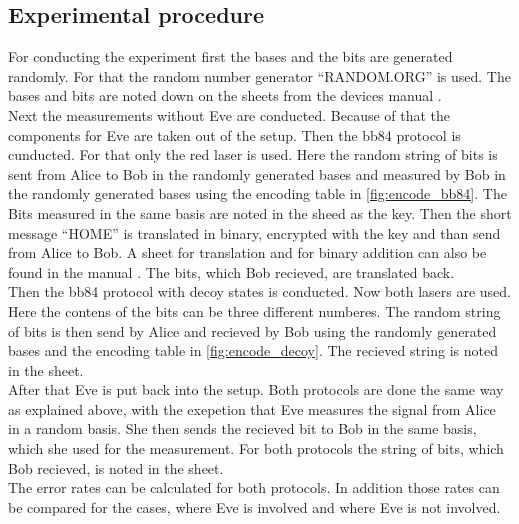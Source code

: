 \subsection{Experimental procedure}
For conducting the experiment first the bases and the bits are generated randomly. 
For that the random number generator \enquote{RANDOM.ORG} \cite{random} is used. 
The bases and bits are noted down on the sheets from the devices manual \cite{thorlabs_edu-qcry1}.
\\
Next the measurements without Eve are conducted. 
Because of that the components for Eve are taken out of the setup. 
Then the bb84 protocol is cunducted.
For that only the red laser is used.
Here the random string of bits is sent from Alice to Bob in the randomly generated bases and measured by Bob in the randomly generated bases using the encoding table in \autoref{fig:encode_bb84}.
The Bits measured in the same basis are noted in the sheed as the key. 
Then the short message \enquote{HOME} is translated in binary, encrypted with the key and than send from Alice to Bob.
A sheet for translation and for binary addition can also be found in the manual \cite{thorlabs_edu-qcry1}. 
The bits, which Bob recieved, are translated back. 
\\
Then the bb84 protocol with decoy states is conducted. 
Now both lasers are used. 
Here the contens of the bits can be three different numberes. 
The random string of bits is then send by Alice and recieved by Bob using the randomly generated bases and the encoding table in \autoref{fig:encode_decoy}.
The recieved string is noted in the sheet. 
\\
After that Eve is put back into the setup.
Both protocols are done the same way as explained above, with the exepetion that Eve measures the signal from Alice in a random basis. 
She then sends the recieved bit to Bob in the same basis, which she used for the measurement. 
For both protocols the string of bits, which Bob recieved, is noted in the sheet. 
\\
The error rates can be calculated for both protocols.
In addition those rates can be compared for the cases, where Eve is involved and where Eve is not involved.
